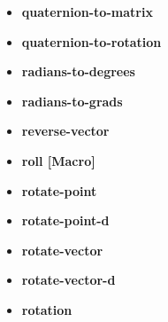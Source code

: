 \documentclass [11pt]{book}
\begin{document}
\begin{itemize}
\item {}
\label{prim:quaternion-to-matrix}
\textbf{quaternion-to-matrix}





\item {}
\label{prim:quaternion-to-rotation}
\textbf{quaternion-to-rotation}





\item {}
\label{prim:radians-to-degrees}
\textbf{radians-to-degrees}





\item {}
\label{prim:radians-to-grads}
\textbf{radians-to-grads}





\item {}
\label{prim:reverse-vector}
\textbf{reverse-vector}





\item {}
\label{prim:roll}
\textbf{roll [Macro]}





\item {}
\label{prim:rotate-point}
\textbf{rotate-point}





\item {}
\label{prim:rotate-point-d}
\textbf{rotate-point-d}





\item {}
\label{prim:rotate-vector}
\textbf{rotate-vector}





\item {}
\label{prim:rotate-vector-d}
\textbf{rotate-vector-d}





\item {}
\label{prim:rotation}
\textbf{rotation}






\end{itemize}
\end{document}
